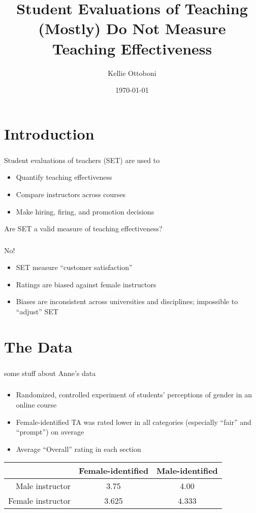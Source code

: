\documentclass{beamer}
\title[SET]{Student Evaluations of Teaching (Mostly) Do Not Measure Teaching Effectiveness}
\author{Kellie Ottoboni}
\institute[]{Department of Statistics, UC Berkeley \\ Berkeley Institute for Data Science}
\date{\today}
\begin{document}
\frame{\titlepage}

\section{Introduction}
\frame
{
  \frametitle{}
 \begin{center}
 \Large{ Student evaluations of teachers (SET) are used to} \\
  \begin{itemize}
  \item Quantify teaching effectiveness
  \item Compare instructors across courses
  \item Make hiring, firing, and promotion decisions  
  \end{itemize}
  \vfill
Are SET a valid measure of teaching effectiveness?
\end{center}
}

\frame
{
  \frametitle{}
  \begin{center}
  \Huge{No!}
\vfill
\Large
  \begin{itemize}
  \item SET measure ``customer satisfaction''
  \item Ratings are biased against female instructors
  \item Biases are inconsistent across universities and disciplines; impossible to ``adjust'' SET
  \end{itemize}
  \end{center}
}

\section{The Data}
\frame
{
  \frametitle{\cite{Boring2015}}
 some stuff about Anne's data
}

\frame
{
  \frametitle{\cite{MacNell2014}}
\begin{itemize}
\item Randomized, controlled experiment of students' perceptions of gender in an online course
\item Female-identified TA was rated lower in all categories (especially ``fair'' and ``prompt'') on average
\item Average ``Overall'' rating in each section
\end{itemize}
\begin{table}[htdp]
\begin{center}
\begin{tabular}{r|c|c|}
& Female-identified & Male-identified \\
\hline
Male instructor & 3.75 & 4.00\\
Female instructor & 3.625 & 4.333\\
\end{tabular}
\end{center}
\label{default}
\end{table}%


}
\end{document}

